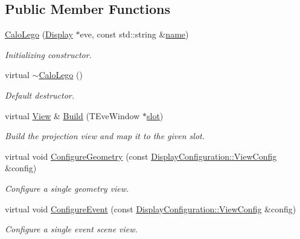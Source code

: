 \subsection*{Public Member Functions}
\begin{DoxyCompactItemize}
\item 
\hyperlink{class_d_d4hep_1_1_calo_lego_abeda4832cbd7103bbd3b1d4bfe2fe1dc}{Calo\+Lego} (\hyperlink{class_d_d4hep_1_1_display}{Display} $\ast$eve, const std\+::string \&\hyperlink{class_d_d4hep_1_1_view_ae369eadf16399a6bf34f1ce491b7a788}{name})
\begin{DoxyCompactList}\small\item\em Initializing constructor. \end{DoxyCompactList}\item 
virtual \hyperlink{class_d_d4hep_1_1_calo_lego_a8416ec621ced1b3b415e48da1cd5c45b}{$\sim$\+Calo\+Lego} ()
\begin{DoxyCompactList}\small\item\em Default destructor. \end{DoxyCompactList}\item 
virtual \hyperlink{class_d_d4hep_1_1_view}{View} \& \hyperlink{class_d_d4hep_1_1_calo_lego_ab1ef28e69a78dbe27e6a33b1d22cc713}{Build} (T\+Eve\+Window $\ast$\hyperlink{_multi_view_8cpp_a402e7b855ac7bcf09e2ecf5e98220a11}{slot})
\begin{DoxyCompactList}\small\item\em Build the projection view and map it to the given slot. \end{DoxyCompactList}\item 
virtual void \hyperlink{class_d_d4hep_1_1_calo_lego_aca92ae6d2fe4e24a928fa23dbe755d19}{Configure\+Geometry} (const \hyperlink{class_d_d4hep_1_1_display_configuration_1_1_view_config}{Display\+Configuration\+::\+View\+Config} \&config)
\begin{DoxyCompactList}\small\item\em Configure a single geometry view. \end{DoxyCompactList}\item 
virtual void \hyperlink{class_d_d4hep_1_1_calo_lego_a997e3fea32d37374ef4c6c95e087af9c}{Configure\+Event} (const \hyperlink{class_d_d4hep_1_1_display_configuration_1_1_view_config}{Display\+Configuration\+::\+View\+Config} \&config)
\begin{DoxyCompactList}\small\item\em Configure a single event scene view. \end{DoxyCompactList}\item 

\end{DoxyCompactItemize}
